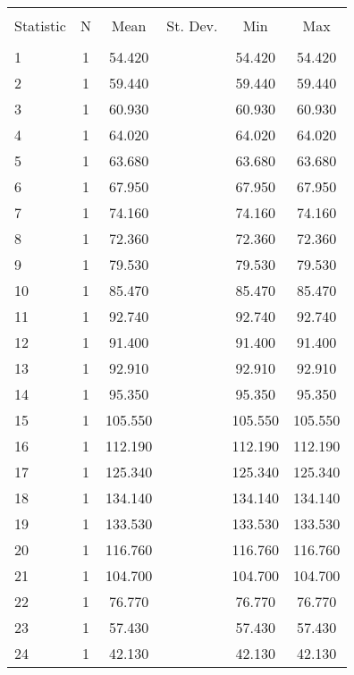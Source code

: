 
\begin{table}[!htbp] \centering 
  \caption{} 
  \label{} 
\begin{tabular}{@{\extracolsep{5pt}}lccccc} 
\\[-1.8ex]\hline 
\hline \\[-1.8ex] 
Statistic & \multicolumn{1}{c}{N} & \multicolumn{1}{c}{Mean} & \multicolumn{1}{c}{St. Dev.} & \multicolumn{1}{c}{Min} & \multicolumn{1}{c}{Max} \\ 
\hline \\[-1.8ex] 
1 & 1 & 54.420 &  & 54.420 & 54.420 \\ 
2 & 1 & 59.440 &  & 59.440 & 59.440 \\ 
3 & 1 & 60.930 &  & 60.930 & 60.930 \\ 
4 & 1 & 64.020 &  & 64.020 & 64.020 \\ 
5 & 1 & 63.680 &  & 63.680 & 63.680 \\ 
6 & 1 & 67.950 &  & 67.950 & 67.950 \\ 
7 & 1 & 74.160 &  & 74.160 & 74.160 \\ 
8 & 1 & 72.360 &  & 72.360 & 72.360 \\ 
9 & 1 & 79.530 &  & 79.530 & 79.530 \\ 
10 & 1 & 85.470 &  & 85.470 & 85.470 \\ 
11 & 1 & 92.740 &  & 92.740 & 92.740 \\ 
12 & 1 & 91.400 &  & 91.400 & 91.400 \\ 
13 & 1 & 92.910 &  & 92.910 & 92.910 \\ 
14 & 1 & 95.350 &  & 95.350 & 95.350 \\ 
15 & 1 & 105.550 &  & 105.550 & 105.550 \\ 
16 & 1 & 112.190 &  & 112.190 & 112.190 \\ 
17 & 1 & 125.340 &  & 125.340 & 125.340 \\ 
18 & 1 & 134.140 &  & 134.140 & 134.140 \\ 
19 & 1 & 133.530 &  & 133.530 & 133.530 \\ 
20 & 1 & 116.760 &  & 116.760 & 116.760 \\ 
21 & 1 & 104.700 &  & 104.700 & 104.700 \\ 
22 & 1 & 76.770 &  & 76.770 & 76.770 \\ 
23 & 1 & 57.430 &  & 57.430 & 57.430 \\ 
24 & 1 & 42.130 &  & 42.130 & 42.130 \\ 

\end{tabular}
\end{table}

